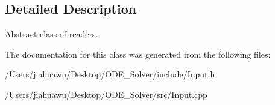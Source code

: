 \subsection{Detailed Description}
Abstract class of readers. 

The documentation for this class was generated from the following files\+:\begin{DoxyCompactItemize}
\item 
/\+Users/jiahuawu/\+Desktop/\+O\+D\+E\+\_\+\+Solver/include/Input.\+h\item 
/\+Users/jiahuawu/\+Desktop/\+O\+D\+E\+\_\+\+Solver/src/Input.\+cpp\end{DoxyCompactItemize}
